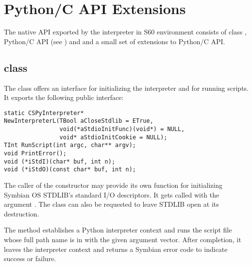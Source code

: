 %
%
%

\section{Python/C API Extensions}
\label{capiextensions}

The native API exported by the interpreter in S60 environment
consists of class , Python/C API (see
\cite{PyCAPI}) and and a small set of extensions to Python/C API.

\subsection{class }
The class  offers an interface for initializing the 
interpreter and for running scripts. It exports the following public 
interface:
\begin{verbatim}
static CSPyInterpreter* 
NewInterpreterL(TBool aCloseStdlib = ETrue,
                void(*aStdioInitFunc)(void*) = NULL,
                void* aStdioInitCookie = NULL);
TInt RunScript(int argc, char** argv);
void PrintError();
void (*iStdI)(char* buf, int n);
void (*iStdO)(const char* buf, int n);
\end{verbatim}

The caller of the constructor  may 
provide its own function  for initializing Symbian OS 
STDLIB's standard I/O descriptors. It gets called with the argument 
. The  class can also be 
requested to leave STDLIB open at its destruction.

The  method establishes a Python 
interpreter context and runs the script file whose full path name is in 
 with the given argument vector. After completion, it leaves 
the interpreter context and returns a Symbian error code to indicate success 
or failure.

